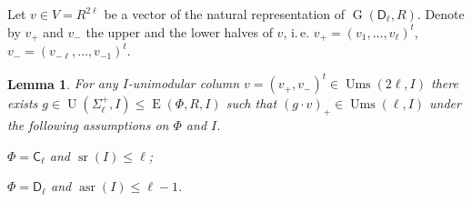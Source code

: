 \documentclass[oneside, 12pt]{amsart}
\theoremstyle{plain}
\numberwithin{equation}{section}
\newtheorem{lemma}{Lemma}
\numberwithin{lemma}{section}
\theoremstyle{definition}
\theoremstyle{remark}
\DeclareMathOperator{\G}{G}
\DeclareMathOperator{\E}{E}
\DeclareMathOperator{\U}{U}
\DeclareMathOperator{\sr}{sr}
\DeclareMathOperator{\asr}{asr}
\DeclareMathOperator{\Ums}{Ums}
\newcommand{\rC}{\mathsf{C}}
\newcommand{\rD}{\mathsf{D}}
\begin{document}
Let $v\in V=R^{2\ell}$ be a vector of the natural representation of $\G(\rD_\ell, R)$.
Denote by $v_+$ and $v_-$ the upper and the lower halves of $v$, i.\,e. $v_+=(v_1, \ldots, v_\ell)^t$, $v_-=(v_{-\ell}, \ldots, v_{-1})^t$.
\begin{lemma}\label{lemma:asrUnip}
For any $I$-unimodular column $v=(v_+, v_-)^t\in\Ums(2\ell, I)$ there exists $g\in\U(\Sigma^+_\ell, I) \leq \E(\Phi, R, I)$ 
such that $(g \cdot v)_+ \in \Ums(\ell, I)$ under the following assumptions on $\Phi$ and $I$.
\begin{lemlist}
\item \label{item:asrUnipC} $\Phi=\rC_\ell$ and $\sr(I) \leqslant \ell$;
\item \label{item:asrUnipD} $\Phi=\rD_\ell$ and $\asr(I)\leqslant \ell -1$.
\end{lemlist}
\end{lemma}
\end{document}
